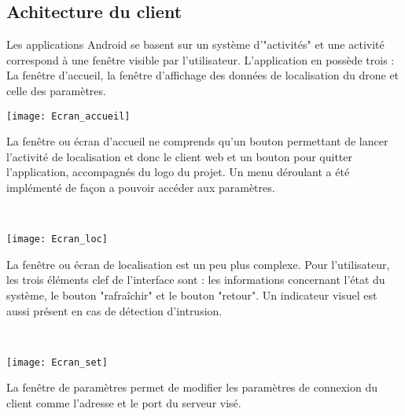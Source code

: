 \subsection{Achitecture du client}

	Les applications Android se basent sur un système d'"activités" et une activité correspond à une fenêtre visible par l'utilisateur. L'application en possède trois : La fenêtre d'accueil, la fenêtre d'affichage des données de localisation du drone et celle des paramètres.
	
	\begin{minipage}{0.45\linewidth}
 		\centering
  		\texttt{[image: Ecran\_accueil]}
	\end{minipage}
	\begin{minipage}{0.45\linewidth}

	La fenêtre ou écran d'accueil ne comprends qu'un bouton permettant de lancer l'activité de localisation et donc le client web et un bouton pour quitter l'application, accompagnés du logo du projet. Un menu déroulant a été implémenté de façon a pouvoir accéder aux paramètres.
	\end{minipage}
	~\\	
	
	\begin{minipage}{0.45\linewidth}
 		\centering
 	 \texttt{[image: Ecran\_loc]}
	\end{minipage}
	\begin{minipage}{0.45\linewidth}
	 La fenêtre ou écran de localisation est un peu plus complexe. Pour l'utilisateur, les trois éléments clef de l'interface sont : les informations concernant l'état du système, le bouton "rafraîchir" et le bouton "retour". Un indicateur visuel est aussi présent en cas de détection d'intrusion.
	\end{minipage}
	~\\
	
	\begin{minipage}{0.45\linewidth}
  	\centering
 	 \texttt{[image: Ecran\_set]}
	\end{minipage}
	\begin{minipage}{0.45\linewidth}
	La fenêtre de paramètres permet de modifier les paramètres de connexion du client comme l'adresse et le port du serveur visé.
	\end{minipage}
	~\\	
	
